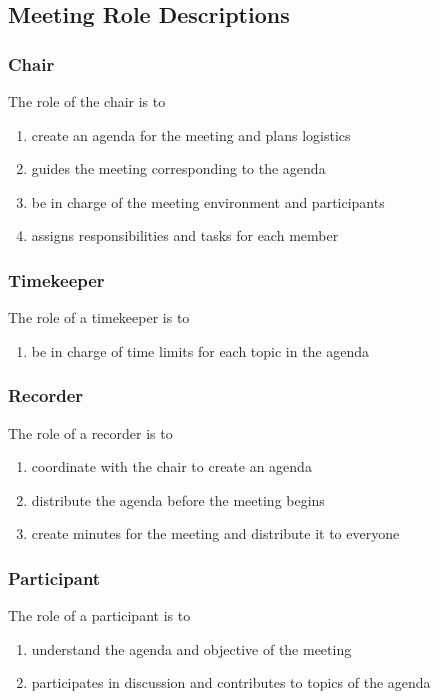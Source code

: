 \documentclass[12pt,letterpaper]{article}
\begin{document}
\subsection{Meeting Role Descriptions}

\subsubsection{Chair}
The role of the chair is to
\begin{enumerate}
    \item create an agenda for the meeting and plans logistics
    \item guides the meeting corresponding to the agenda
    \item be in charge of the meeting environment and participants
    \item assigns responsibilities and tasks for each member
\end{enumerate}

\subsubsection{Timekeeper}
The role of a timekeeper is to
\begin{enumerate}
    \item be in charge of time limits for each topic in the agenda
\end{enumerate}

\subsubsection{Recorder}
The role of a recorder is to 
\begin{enumerate}
    \item coordinate with the chair to create an agenda
    \item distribute the agenda before the meeting begins
    \item create minutes for the meeting and distribute it to everyone
\end{enumerate}

\subsubsection{Participant}
The role of a participant is to 
\begin{enumerate}
    \item understand the agenda and objective of the meeting
    \item participates in discussion and contributes to topics of the agenda
\end{enumerate}
\end{document}

